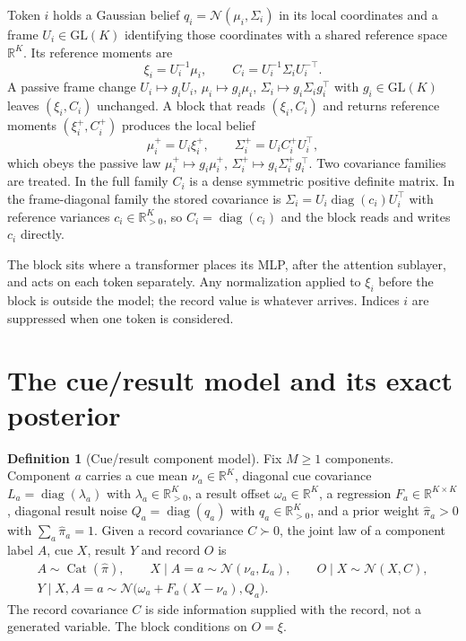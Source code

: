\documentclass[11pt]{article}
\theoremstyle{definition}
\newtheorem{definition}[theorem]{Definition}
\theoremstyle{remark}
\providecommand{\GL}{\mathrm{GL}}
\newcommand{\R}{\mathbb R}
\newcommand{\Gauss}{\mathcal N}
\newcommand{\Cat}{\operatorname{Cat}}
\newcommand{\diag}{\operatorname{diag}}
\newcommand{\pihat}{\hat\pi}
\begin{document}
Token $i$ holds a Gaussian belief $q_i=\Gauss(\mu_i,\Sigma_i)$ in its local coordinates and a frame $U_i\in\GL(K)$ identifying those coordinates with a shared reference space $\R^K$. Its reference moments are
\begin{equation}
\xi_i=U_i^{-1}\mu_i,\qquad C_i=U_i^{-1}\Sigma_iU_i^{-\top}.
\label{crm:eq:reference}
\end{equation}
A passive frame change $U_i\mapsto g_iU_i$, $\mu_i\mapsto g_i\mu_i$, $\Sigma_i\mapsto g_i\Sigma_ig_i^\top$ with $g_i\in\GL(K)$ leaves $(\xi_i,C_i)$ unchanged. A block that reads $(\xi_i,C_i)$ and returns reference moments $(\xi_i^+,C_i^+)$ produces the local belief
\begin{equation}
\mu_i^+=U_i\xi_i^+,\qquad \Sigma_i^+=U_iC_i^+U_i^\top,
\label{crm:eq:return}
\end{equation}
which obeys the passive law $\mu_i^+\mapsto g_i\mu_i^+$, $\Sigma_i^+\mapsto g_i\Sigma_i^+g_i^\top$. Two covariance families are treated. In the full family $C_i$ is a dense symmetric positive definite matrix. In the frame-diagonal family the stored covariance is $\Sigma_i=U_i\diag(c_i)U_i^\top$ with reference variances $c_i\in\R^K_{>0}$, so $C_i=\diag(c_i)$ and the block reads and writes $c_i$ directly.

The block sits where a transformer places its MLP, after the attention sublayer, and acts on each token separately. Any normalization applied to $\xi_i$ before the block is outside the model; the record value is whatever arrives. Indices $i$ are suppressed when one token is considered.

\section{The cue/result model and its exact posterior}
\label{crm:sec:model}

\begin{definition}[Cue/result component model]
\label{crm:def:model}
Fix $M\ge1$ components. Component $a$ carries a cue mean $\nu_a\in\R^K$, diagonal cue covariance $L_a=\diag(\lambda_a)$ with $\lambda_a\in\R^K_{>0}$, a result offset $\omega_a\in\R^K$, a regression $F_a\in\R^{K\times K}$, diagonal result noise $Q_a=\diag(q_a)$ with $q_a\in\R^K_{>0}$, and a prior weight $\pihat_a>0$ with $\sum_a\pihat_a=1$. Given a record covariance $C\succ0$, the joint law of a component label $A$, cue $X$, result $Y$ and record $O$ is
\begin{equation}
\begin{gathered}
A\sim\Cat(\pihat),\qquad X\mid A=a\sim\Gauss(\nu_a,L_a),\qquad O\mid X\sim\Gauss(X,C),\\
Y\mid X,A=a\sim\Gauss\bigl(\omega_a+F_a(X-\nu_a),Q_a\bigr).
\end{gathered}
\label{crm:eq:model}
\end{equation}
The record covariance $C$ is side information supplied with the record, not a generated variable. The block conditions on $O=\xi$.
\end{definition}
\end{document}

